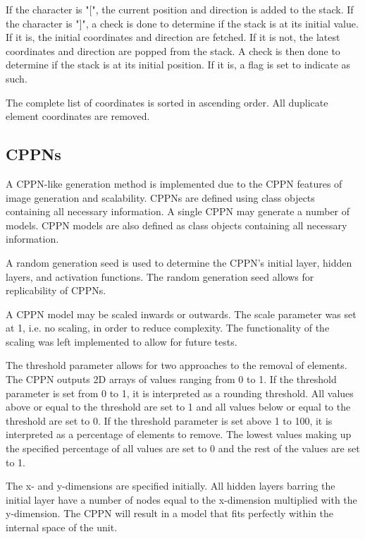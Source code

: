 If the character is "[", the current position and direction is added to the stack. If the character is "]", a check is done to determine if the stack is at its initial value. If it is, the initial coordinates and direction are fetched. If it is not, the latest coordinates and direction are popped from the stack. A check is then done to determine if the stack is at its initial position. If it is, a flag is set to indicate as such.

The complete list of coordinates is sorted in ascending order. All duplicate element coordinates are removed.

\subsection{CPPNs}
\label{ssec:CPPN}

A CPPN-like generation method is implemented due to the CPPN features of image generation and scalability. CPPNs are defined using class objects containing all necessary information. A single CPPN may generate a number of models. CPPN models are also defined as class objects containing all necessary information.

A random generation seed is used to determine the CPPN's initial layer, hidden layers, and activation functions. The random generation seed allows for replicability of CPPNs.

A CPPN model may be scaled inwards or outwards. The scale parameter was set at 1, i.e. no scaling, in order to reduce complexity. The functionality of the scaling was left implemented to allow for future tests.

The threshold parameter allows for two approaches to the removal of elements. The CPPN outputs 2D arrays of values ranging from 0 to 1. If the threshold parameter is set from 0 to 1, it is interpreted as a rounding threshold. All values above or equal to the threshold are set to 1 and all values below or equal to the threshold are set to 0. If the threshold parameter is set above 1 to 100, it is interpreted as a percentage of elements to remove. The lowest values making up the specified percentage of all values are set to 0 and the rest of the values are set to 1.

The x- and y-dimensions are specified initially. All hidden layers barring the initial layer have a number of nodes equal to the x-dimension multiplied with the y-dimension. The CPPN will result in a model that fits perfectly within the internal space of the unit.

